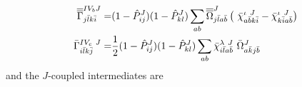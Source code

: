 \documentclass[11pt]{article}
\newcommand{\MyRomanNum}[1]{%
\ifcase#1\or I\or II\or III\or IV\or V\or VI\or VII\or VIII\or IX\or X\else #1\fi}
\begin{document}
\begin{subequations}
\begin{align}
\overline{\overline{ \Gamma}}^{\MyRomanNum{4}_b J}_{j \bar l k \bar i} =& (1 - \hat P^J_{ij} )  (1 - \hat P^J_{kl} ) %
\sum_{ab} \overline{\overline{  \Omega}}^{J}_{j \bar l a \bar b} \left(   ~ \bar \chi^{\iota~J}_{a \bar b k \bar i}  
  -  \bar \chi^{\iota~J}_{ k \bar i a \bar b } \right) \\ 
\bar \Gamma^{\MyRomanNum{4}_c~J}_{i \bar l k \bar j}  =&   \frac{1}{2} (1 - \hat P^J_{ij} )  (1 - \hat P^J_{kl} ) \sum_{ab} \bar \chi^{\lambda~J}_{i \bar l a \bar b}  ~ \bar\Omega^{J}_{a\bar k j \bar  b}  
\end{align}
\end{subequations}
and the $J$-coupled intermediates are
\end{document}
